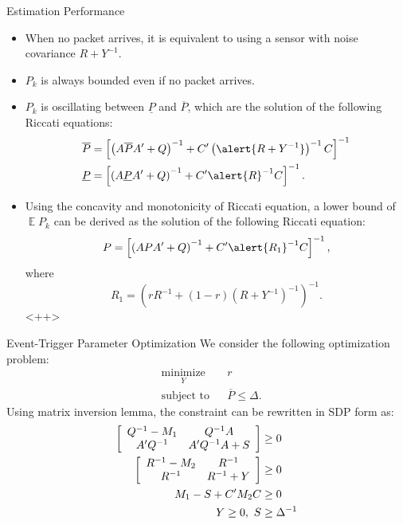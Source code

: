 \documentclass{beamer}
\DeclareMathOperator{\E}{\mathbb E}
\begin{document}
  \begin{frame}{Estimation Performance}
    \begin{itemize}
      \item When no packet arrives, it is equivalent to using a sensor with noise covariance $R + Y^{-1}$.
      \item $P_k$ is always bounded even if no packet arrives. 
      \item $P_k$ is oscillating between $\underline P$ and $\overline P$, which are the solution of the following Riccati equations:
	\begin{displaymath}
	  \begin{split}
	    \overline P &= \left[\left(A\overline PA' + Q\right)^{-1} + C'\left( \alert{R+Y^{-1} }\right)^{-1}C\right]^{-1}\\
	    \underline P &= \left[\left(A\underline PA' + Q\right)^{-1} + C'\alert{R}^{-1}C\right]^{-1}.
	  \end{split}
	\end{displaymath}
      \item Using the concavity and monotonicity of Riccati equation, a lower bound of $\E P_k$ can be derived as the solution of the following Riccati equation:
	\begin{displaymath}
	    P= \left[\left(A PA' + Q\right)^{-1} + C' \alert{R_1}^{-1}C\right]^{-1},
	\end{displaymath}
	where
	\begin{displaymath}
	  R_1 = \left( rR^{-1} + (1-r)(R+Y^{-1})^{-1} \right)^{-1}.
	\end{displaymath}<++>
    \end{itemize}
  \end{frame}

  \begin{frame}{Event-Trigger Parameter Optimization}
    We consider the following optimization problem:
    \begin{align*}
      &\mathop{\textrm{minimize}}\limits_{Y}&
      & r\nonumber\\
      &\textrm{subject to}&
      & \overline P\leq \Delta.
    \end{align*}
    Using matrix inversion lemma, the constraint can be rewritten in SDP form as:
    \begin{align*}
      \left[ {\begin{array}{*{5}c}
	Q^{-1}-M_1  &  Q^{-1}A\\
	A^{\prime}Q^{-1} & A^{\prime}Q^{-1}A + S
      \end{array}} \right] &\ge 0 \nonumber
      \\
      \left[ {\begin{array}{*{5}c}
	R^{-1}-M_2  &  R^{-1}\\
	R^{-1} & R^{-1}+Y
      \end{array}} \right] &\ge 0 \nonumber
      \\ M_1 - S + C^{\prime}M_2C &\ge 0 \nonumber \\
      Y \ge 0, ~ S &\ge \Delta^{-1}
    \end{align*}
  \end{frame}
\end{document}
